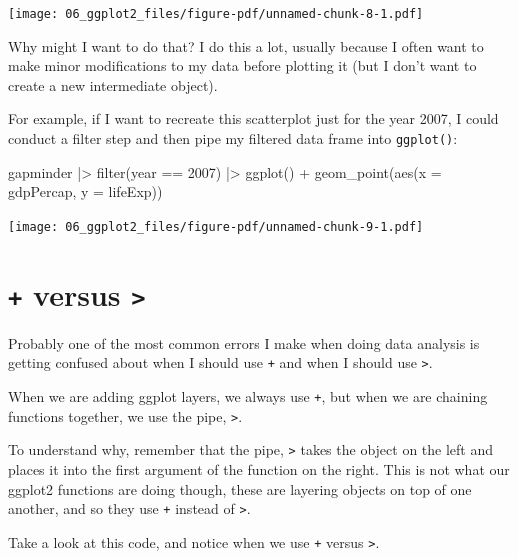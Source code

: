 \documentclass[
  letterpaper,
  DIV=11,
  numbers=noendperiod]{scrreprt}
\newenvironment{Shaded}{\begin{snugshade}}{\end{snugshade}}
\newcommand{\AttributeTok}[1]{\textcolor[rgb]{0.40,0.45,0.13}{#1}}
\newcommand{\DecValTok}[1]{\textcolor[rgb]{0.68,0.00,0.00}{#1}}
\newcommand{\FunctionTok}[1]{\textcolor[rgb]{0.28,0.35,0.67}{#1}}
\newcommand{\NormalTok}[1]{\textcolor[rgb]{0.00,0.23,0.31}{#1}}
\newcommand{\SpecialCharTok}[1]{\textcolor[rgb]{0.37,0.37,0.37}{#1}}
\begin{document}
\texttt{[image: 06\_ggplot2\_files/figure-pdf/unnamed-chunk-8-1.pdf]}

Why might I want to do that? I do this a lot, usually because I often
want to make minor modifications to my data before plotting it (but I
don't want to create a new intermediate object).

For example, if I want to recreate this scatterplot just for the year
2007, I could conduct a filter step and then pipe my filtered data frame
into \texttt{ggplot()}:

\begin{Shaded}
\begin{Highlighting}[]
\NormalTok{gapminder }\SpecialCharTok{|\textgreater{}}
  \FunctionTok{filter}\NormalTok{(year }\SpecialCharTok{==} \DecValTok{2007}\NormalTok{) }\SpecialCharTok{|\textgreater{}}
  \FunctionTok{ggplot}\NormalTok{() }\SpecialCharTok{+}
  \FunctionTok{geom\_point}\NormalTok{(}\FunctionTok{aes}\NormalTok{(}\AttributeTok{x =}\NormalTok{ gdpPercap, }\AttributeTok{y =}\NormalTok{ lifeExp))}
\end{Highlighting}
\end{Shaded}

\texttt{[image: 06\_ggplot2\_files/figure-pdf/unnamed-chunk-9-1.pdf]}

\section{\texorpdfstring{\texttt{+} versus
\texttt{\textbar{}\textgreater{}}}{+ versus \textbar\textgreater{}}}\label{versus}

Probably one of the most common errors I make when doing data analysis
is getting confused about when I should use \texttt{+} and when I should
use \texttt{\textbar{}\textgreater{}}.

When we are adding ggplot layers, we always use \texttt{+}, but when we
are chaining functions together, we use the pipe,
\texttt{\textbar{}\textgreater{}}.

To understand why, remember that the pipe,
\texttt{\textbar{}\textgreater{}} takes the object on the left and
places it into the first argument of the function on the right. This is
not what our ggplot2 functions are doing though, these are layering
objects on top of one another, and so they use \texttt{+} instead of
\texttt{\textbar{}\textgreater{}}.

Take a look at this code, and notice when we use \texttt{+} versus
\texttt{\textbar{}\textgreater{}}.
\end{document}
